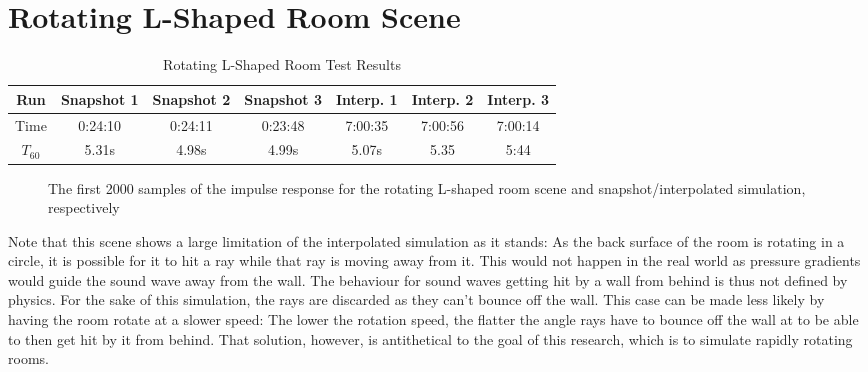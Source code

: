 \section{Rotating L-Shaped Room Scene}\label{sec:LRoom}

\begin{table}[t!]
    \centering
    \begin{tabular}{| c | c | c | c | c | c | c |}
        \hline
        Run        & Snapshot 1 & Snapshot 2 & Snapshot 3 & Interp. 1 & Interp. 2 & Interp. 3 \\
        \hline
        Time       & 0:24:10    & 0:24:11    & 0:23:48    & 7:00:35   & 7:00:56   & 7:00:14   \\
        \hline
        \(T_{60}\) & 5.31s      & 4.98s      & 4.99s      & 5.07s     & 5.35      & 5:44      \\
        \hline
    \end{tabular}
    \caption{Rotating L-Shaped Room Test Results}\label{tbl:LSceneTable}
\end{table}

\begin{figure}[t!]
    \begin{center}
        
    \end{center}
    \caption{The first 2000 samples of the impulse response for the rotating L-shaped room scene and snapshot/interpolated simulation, respectively}\label{fig:LSceneIR}
\end{figure}


Note that this scene shows a large limitation of the interpolated simulation as it stands:
As the back surface of the room is rotating in a circle,
it is possible for it to hit a ray while that ray is moving away from it.
This would not happen in the real world as pressure gradients would guide the sound wave away from the wall.
\newline
The behaviour for sound waves getting hit by a wall from behind is thus not defined by physics.
For the sake of this simulation, the rays are discarded as they can't bounce off the wall.
This case can be made less likely by having the room rotate at a slower speed:
The lower the rotation speed, the flatter the angle rays have to bounce off the wall at to be able to then get hit by it from behind.
That solution, however, is antithetical to the goal of this research, which is to simulate rapidly rotating rooms.
